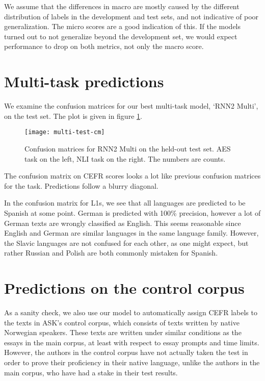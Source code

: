 We assume that the differences in macro \FI are mostly caused by the
different distribution of labels in the development and test sets, and not
indicative of poor generalization. The micro \FI scores are a good indication
of this. If the models turned out to not generalize beyond the development
set, we would expect performance to drop on both metrics, not only the macro
\FI score.


\section{Multi-task predictions}

We examine the confusion matrices for our best multi-task model, `RNN2 Multi',
on the test set. The plot is given in figure \ref{fig:multi-test-cm}.

\begin{figure}
  \centering
  \texttt{[image: multi-test-cm]}
  
  \caption[Multi-task confusion matrices]{
    Confusion matrices for RNN2 Multi on the held-out test set. \ac{AES} task on the left, \ac{NLI}
    task on the right. The numbers are counts.
  }
  \label{fig:multi-test-cm}
\end{figure}

The confusion matrix on CEFR scores looks a lot like previous confusion matrices
for the task. Predictions follow a blurry diagonal.

In the confusion matrix for \acp{L1}, we see that all languages are predicted
to be Spanish at some point. German is predicted with 100\% precision,
however a lot of German texts are wrongly classified as English. This seems
reasonable since English and German are similar languages in the same
language family. However, the Slavic languages are not confused for each
other, as one might expect, but rather Russian and Polish are both commonly
mistaken for Spanish.


\section{Predictions on the control corpus}

As a sanity check, we also use our model to automatically assign CEFR labels
to the texts in ASK's control corpus, which consists of texts written by
native Norwegian speakers. These texts are written under similar conditions as
the essays in the main corpus, at least with respect to essay prompts and time
limits. However, the authors in the control corpus have not actually taken the
test in order to prove their proficiency in their native language, unlike the
authors in the main corpus, who have had a stake in their test results.

